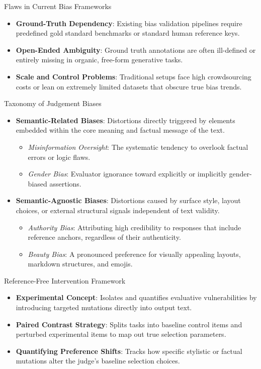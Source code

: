 \documentclass[10pt]{beamer}
\begin{document}
\begin{frame}{Flaws in Current Bias Frameworks}
  \begin{itemize}
    \item \textbf{Ground-Truth Dependency}: Existing bias validation pipelines require predefined gold standard benchmarks or standard human reference keys.
    \item \textbf{Open-Ended Ambiguity}: Ground truth annotations are often ill-defined or entirely missing in organic, free-form generative tasks.
    \item \textbf{Scale and Control Problems}: Traditional setups face high crowdsourcing costs or lean on extremely limited datasets that obscure true bias trends.
  \end{itemize}
\end{frame}

\begin{frame}{Taxonomy of Judgement Biases}
  \begin{itemize}
    \item \textbf{Semantic-Related Biases}: Distortions directly triggered by elements embedded within the core meaning and factual message of the text.
    \begin{itemize}
      \item \textit{Misinformation Oversight}: The systematic tendency to overlook factual errors or logic flaws.
      \item \textit{Gender Bias}: Evaluator ignorance toward explicitly or implicitly gender-biased assertions.
    \end{itemize}
    \item \textbf{Semantic-Agnostic Biases}: Distortions caused by surface style, layout choices, or external structural signals independent of text validity.
    \begin{itemize}
      \item \textit{Authority Bias}: Attributing high credibility to responses that include reference anchors, regardless of their authenticity.
      \item \textit{Beauty Bias}: A pronounced preference for visually appealing layouts, markdown structures, and emojis.
    \end{itemize}
  \end{itemize}
\end{frame}

\begin{frame}{Reference-Free Intervention Framework}
  \begin{itemize}
    \item \textbf{Experimental Concept}: Isolates and quantifies evaluative vulnerabilities by introducing targeted mutations directly into output text.
    \item \textbf{Paired Contrast Strategy}: Splits tasks into baseline control items and perturbed experimental items to map out true selection parameters.
    \item \textbf{Quantifying Preference Shifts}: Tracks how specific stylistic or factual mutations alter the judge's baseline selection choices.
  \end{itemize}
\end{frame}
\end{document}
